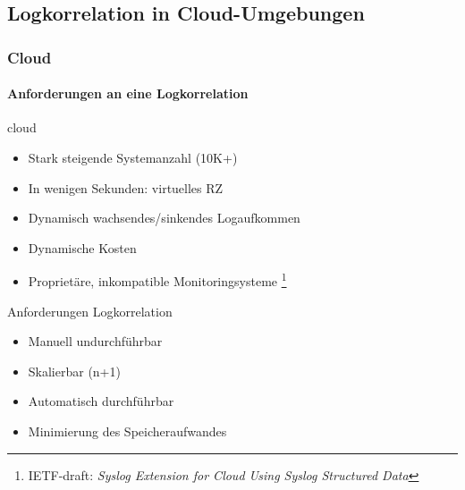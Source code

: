 
\subsection{Logkorrelation in Cloud-Umgebungen}
\begin{frame}
\frametitle{Cloud}
\framesubtitle{Anforderungen an eine Logkorrelation}

    \begin{block}{cloud}
        \begin{itemize}
            \item Stark steigende Systemanzahl (10K+)
            \item In wenigen Sekunden: virtuelles RZ
            \item Dynamisch wachsendes/sinkendes Logaufkommen
            \item Dynamische Kosten
            \item Proprietäre, inkompatible Monitoringsysteme
            \footnote{IETF-draft: \textit{Syslog Extension for Cloud Using Syslog 
            Structured Data}}
        \end{itemize}
    \end{block}
    \pause
    \begin{block}{Anforderungen Logkorrelation}
        \begin{itemize}
            \item Manuell undurchführbar
            \item Skalierbar (n+1)
            \item Automatisch durchführbar
            \item Minimierung des Speicheraufwandes
        \end{itemize}
    \end{block}

\end{frame}


